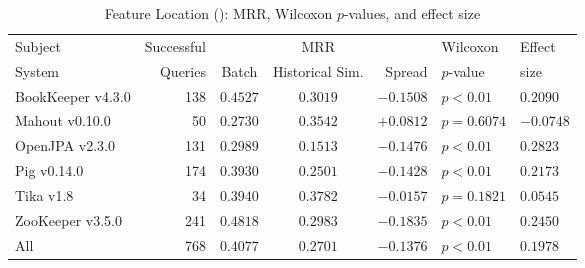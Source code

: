 \begin{table}[t]
\centering
\caption{Feature Location (\ftwo): MRR, Wilcoxon $p$-values, and effect size}
\begin{tabular}{l|r|ccr|ll}
\toprule
Subject & Successful &    & MRR &        & Wilcoxon  & Effect \\
System  & Queries    & Batch & Historical Sim.  & Spread & $p$-value & size \\
\midrule
BookKeeper v4.3.0 & 138 & $\bm{0.4527}$ & $0.3019$ & $-0.1508$ & $p < 0.01$ & $0.2090$ \\
Mahout v0.10.0 & 50 & $0.2730$ & $\bm{0.3542}$ & $+0.0812$ & $p = 0.6074$ & $-0.0748$ \\
OpenJPA v2.3.0 & 131 & $\bm{0.2989}$ & $0.1513$ & $-0.1476$ & $p < 0.01$ & $0.2823$ \\
Pig v0.14.0 & 174 & $\bm{0.3930}$ & $0.2501$ & $-0.1428$ & $p < 0.01$ & $0.2173$ \\
Tika v1.8 & 34 & $\bm{0.3940}$ & $0.3782$ & $-0.0157$ & $p = 0.1821$ & $0.0545$ \\
ZooKeeper v3.5.0 & 241 & $\bm{0.4818}$ & $0.2983$ & $-0.1835$ & $p < 0.01$ & $0.2450$ \\
\midrule
All & 768 & $\bm{0.4077}$ & $0.2701$ & $-0.1376$ & $p < 0.01$ & $0.1978$ \\
\bottomrule
\end{tabular}
\label{table:feature_location_rq2}
\end{table}

